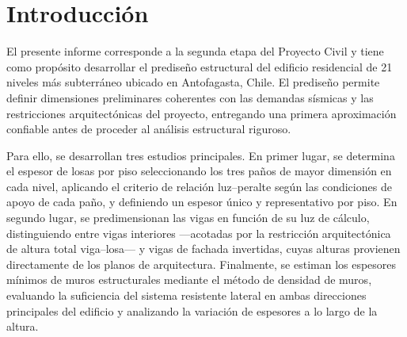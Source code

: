 \section{Introducción}

El presente informe corresponde a la segunda etapa del Proyecto Civil y tiene 
como propósito desarrollar el prediseño estructural del edificio residencial 
de 21 niveles más subterráneo ubicado en Antofagasta, Chile. El prediseño 
permite definir dimensiones preliminares coherentes con las demandas sísmicas 
y las restricciones arquitectónicas del proyecto, entregando una primera 
aproximación confiable antes de proceder al análisis estructural riguroso.

Para ello, se desarrollan tres estudios principales. En primer lugar, se 
determina el espesor de losas por piso seleccionando los tres paños de mayor 
dimensión en cada nivel, aplicando el criterio de relación luz--peralte según 
las condiciones de apoyo de cada paño, y definiendo un espesor único y 
representativo por piso. En segundo lugar, se predimensionan las vigas en 
función de su luz de cálculo, distinguiendo entre vigas interiores —acotadas 
por la restricción arquitectónica de altura total viga--losa— y vigas de 
fachada invertidas, cuyas alturas provienen directamente de los planos de 
arquitectura. Finalmente, se estiman los espesores mínimos de muros 
estructurales mediante el método de densidad de muros, evaluando la 
suficiencia del sistema resistente lateral en ambas direcciones principales 
del edificio y analizando la variación de espesores a lo largo de la altura.